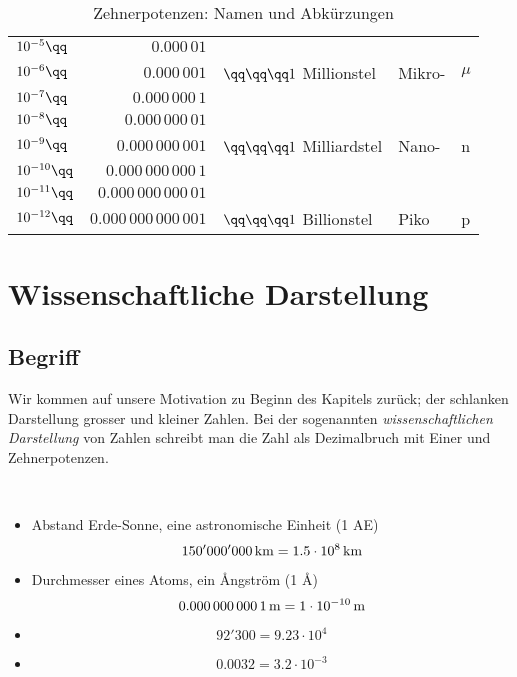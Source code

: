 \documentclass[
twoside,%
ngerman,%
headsepline%
11pt]%
{article}
\begin{document}
\begin{table}
\begin{center}
{\begin{tabular}[ht]{lrlll}
    \rule[-3mm]{0mm}{24pt}
    $10^{-5}\qq$ & $0.000\,01$ &  &  & \\
    \rule[-3mm]{0mm}{24pt}
    $10^{-6}\qq$ & $0.000\,001$ & $\qq\qq\qq1$ Millionstel & \hspace*{1cm}Mikro- & $\mu$\\
    \rule[-3mm]{0mm}{24pt}
    $10^{-7}\qq$ & $0.000\,000\,1$ &  &  & \\
    \rule[-3mm]{0mm}{24pt}
    $10^{-8}\qq$ & $0.000\,000\,01$ &  &  & \\
    \rule[-3mm]{0mm}{24pt}
    $10^{-9}\qq$ & $0.000\,000\,001$ & $\qq\qq\qq1$ Milliardstel & \hspace*{1cm}Nano- & n\\
    \rule[-3mm]{0mm}{24pt}
    $10^{-10}\qq$ & $0.000\,000\,000\,1$ &  &  & \\
    \rule[-3mm]{0mm}{24pt}
    $10^{-11}\qq$ & $0.000\,000\,000\,01$ &  &  & \\
    \rule[-3mm]{0mm}{24pt}
    $10^{-12}\qq$ & $0.000\,000\,000\,001$ & $\qq\qq\qq1$ Billionstel & \hspace*{1cm}Piko & p\\
  \end{tabular}
  }
    \end{center}
    \caption{Zehnerpotenzen: Namen und Abk\"urzungen}\label{tab:zehnerpotenzen}
 \end{table}

\section{Wissenschaftliche Darstellung}
\subsection{Begriff}
Wir kommen auf unsere Motivation zu Beginn des Kapitels zur\"uck; der schlanken Darstellung grosser und kleiner Zahlen. Bei der sogenannten \emph{wissenschaftlichen Darstellung} von Zahlen schreibt man die Zahl als Dezimalbruch mit Einer und Zehnerpotenzen.
\begin{bsps}
\ \\[-2ex]
\begin{itemize}
\item Abstand Erde-Sonne, eine astronomische Einheit (1 AE)
$$\unit[150'000'000]{km}=\unit[1.5\cdot10^8]{km}$$
\item Durchmesser eines Atoms, ein \AA ngstr\"om (1 \AA)
$$\unit[0.000\,000\,000\,1]{m}=\unit[1\cdot10^{-10}]{m}$$
\item $$92'300=9.23\cdot10^4$$
\item $$0.0032=3.2\cdot10^{-3}$$
\end{itemize}
\end{bsps}
\end{document}
